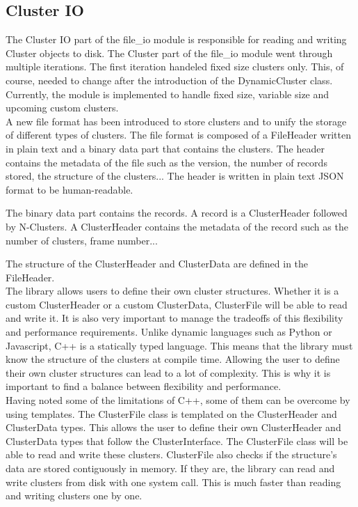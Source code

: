 \begin{spacing}{1.2}
    \subsection{Cluster IO}
    The Cluster IO part of the file\_io module is responsible for reading and writing Cluster objects to disk.
    The Cluster part of the file\_io module went through multiple iterations. The first iteration
    handeled fixed size clusters only. This, of course, needed to change after the introduction
    of the DynamicCluster class. Currently, the module is implemented to handle fixed size,
    variable size and upcoming custom clusters.\\

    A new file format has been introduced to store clusters and to unify the storage of different
    types of clusters. The file format is composed of a FileHeader written in plain text and a binary
    data part that contains the clusters. The header contains the metadata of the file such as
    the version, the number of records stored, the structure of the clusters... The header is
    written in plain text JSON format to be human-readable.

    The binary data part contains the
    records. A record is a ClusterHeader followed by N-Clusters. A ClusterHeader contains the
    metadata of the record such as the number of clusters, frame number...

    The structure of the ClusterHeader and ClusterData are defined in the FileHeader.\\

    The library allows users to define their own cluster structures. Whether it is
    a custom ClusterHeader or a custom ClusterData, ClusterFile will be able to read and write
    it. It is also very important to manage the tradeoffs of this flexibility and performance
    requirements. Unlike dynamic languages such as Python or Javascript, C++ is a statically typed
    language. This means that the library must know the structure of the clusters at compile time.
    Allowing the user to define their own cluster structures can lead to a lot of complexity.
    This is why it is important to find a balance between flexibility and performance.\\

    Having noted some of the limitations of C++, some of them can be overcome by using templates.
    The ClusterFile class is templated on the ClusterHeader and ClusterData types. This allows
    the user to define their own ClusterHeader and ClusterData types that follow the ClusterInterface.
    The ClusterFile class will be able to read and write these clusters. ClusterFile also
    checks if the structure's data are stored contiguously in memory. If they are, the library
    can read and write clusters from disk with one system call. This is much faster than reading
    and writing clusters one by one.\\


\end{spacing}
